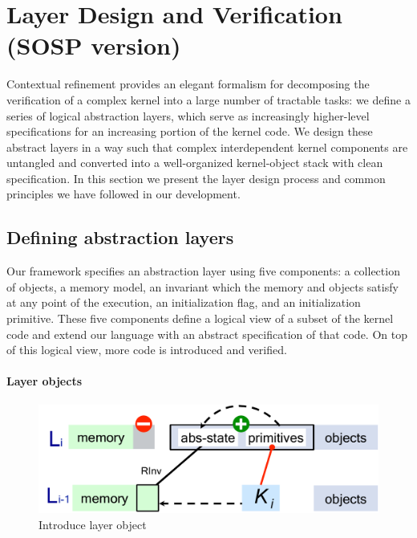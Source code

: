 \section{Layer Design and Verification (SOSP version)}
\label{sec:spec}
{}
Contextual refinement provides an elegant formalism for decomposing
the verification of a complex kernel into a large number of tractable
tasks: we define a series of logical abstraction layers, which serve
as increasingly higher-level specifications for an increasing portion
of the kernel code.  We design these abstract layers in a way such
that complex interdependent kernel components are untangled and
converted into a well-organized kernel-object stack with clean
specification.  In this section we present the layer design process
and common principles we have followed in our development.

\subsection{Defining abstraction layers}

Our framework specifies an abstraction layer
using five components:
a collection of objects,
a memory model,
an invariant which the memory and objects satisfy
at any point of the execution,
an initialization flag,
and an initialization primitive.
These five components define a logical view of
a subset of the kernel code
and extend our language with
an abstract specification of that code.
On top of this logical view, more code is introduced and
verified.

\paragraph{Layer objects}
\begin{figure}
\begin{center}
\includegraphics[scale=0.35]{figs/object}
\vspace*{-8pt}	
\end{center}
\caption{Introduce layer object}
\label{fig:spec:object2}
\vspace*{-10pt}
\end{figure}

